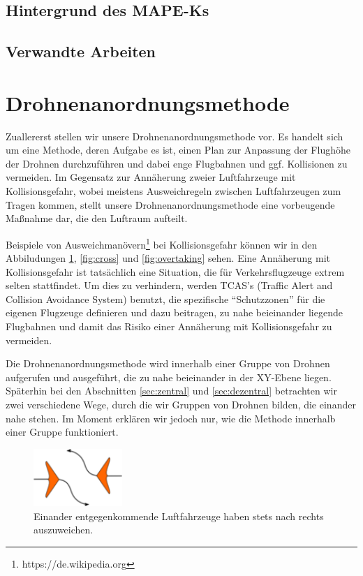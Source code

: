 \documentclass[a4paper,titlepage,onecolumn,twoside,12pt]{article}
\begin{document}
\subsection{Hintergrund des MAPE-Ks}
\label{subsec:hintergrund}
\subsection{Verwandte Arbeiten} %
\label{subsec:verwandte}

\section{Drohnenanordnungsmethode}
\label{sec:drohnenanordnungs}
Zuallererst stellen wir unsere Drohnenanordnungsmethode vor. Es handelt sich um eine Methode, deren Aufgabe es ist, einen Plan zur Anpassung der Flughöhe 
der Drohnen durchzuführen und dabei enge Flugbahnen und ggf. Kollisionen zu vermeiden. Im Gegensatz zur Annäherung zweier Luftfahrzeuge mit 
Kollisionsgefahr, wobei meistens Ausweichregeln zwischen Luftfahrzeugen zum Tragen kommen, stellt unsere Drohnenanordnungsmethode eine vorbeugende Maßnahme   
dar, die den Luftraum aufteilt. 

Beispiele von Ausweichmanövern\footnote{https://de.wikipedia.org} bei Kollisionsgefahr können wir in den Abbiludungen 
\ref{fig:encounter}, \ref{fig:cross} und \ref{fig:overtaking} sehen. Eine Annäherung mit Kollisionsgefahr ist tatsächlich eine Situation, die für 
Verkehrsflugzeuge extrem selten stattfindet. Um dies zu verhindern, werden TCAS's (Traffic Alert and Collision Avoidance System) benutzt, die spezifische
"`Schutzzonen"' für die eigenen Flugzeuge definieren und dazu beitragen, zu nahe beieinander liegende Flugbahnen und damit das Risiko einer Annäherung mit 
Kollisionsgefahr zu vermeiden.

Die Drohnenanordnungsmethode wird innerhalb einer Gruppe von Drohnen aufgerufen und ausgeführt, die zu nahe beieinander in der XY-Ebene liegen. Späterhin bei den Abschnitten \ref{sec:zentral} und \ref{sec:dezentral} betrachten wir zwei verschiedene Wege, durch die wir Gruppen von Drohnen bilden, die einander nahe stehen. Im Moment erklären wir jedoch nur, wie die Methode innerhalb einer Gruppe funktioniert.


\begin{figure}
\centering
\includegraphics[width=0.3\textwidth]{120px-Encounter_rule}
\caption{Einander entgegenkommende Luftfahrzeuge haben stets nach rechts auszuweichen.}
\label{fig:encounter}
\end{figure}
\end{document}
